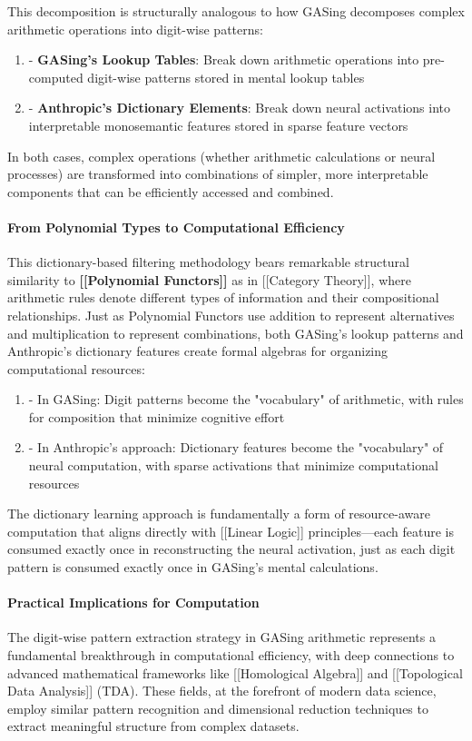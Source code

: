 \documentclass[11pt,a4paper]{article}
\begin{document}
This decomposition is structurally analogous to how GASing decomposes complex arithmetic operations into digit-wise patterns:

\begin{enumerate}
  \item - \textbf{GASing's Lookup Tables}: Break down arithmetic operations into pre-computed digit-wise patterns stored in mental lookup tables
  \item - \textbf{Anthropic's Dictionary Elements}: Break down neural activations into interpretable monosemantic features stored in sparse feature vectors
\end{enumerate}

In both cases, complex operations (whether arithmetic calculations or neural processes) are transformed into combinations of simpler, more interpretable components that can be efficiently accessed and combined.

\paragraph{From Polynomial Types to Computational Efficiency}
This dictionary-based filtering methodology bears remarkable structural similarity to \textbf{[[Polynomial Functors]]} as in [[Category Theory]], where arithmetic rules denote different types of information and their compositional relationships. Just as Polynomial Functors use addition to represent alternatives and multiplication to represent combinations, both GASing's lookup patterns and Anthropic's dictionary features create formal algebras for organizing computational resources:

\begin{enumerate}
  \item - In GASing: Digit patterns become the "vocabulary" of arithmetic, with rules for composition that minimize cognitive effort
  \item - In Anthropic's approach: Dictionary features become the "vocabulary" of neural computation, with sparse activations that minimize computational resources
\end{enumerate}

The dictionary learning approach is fundamentally a form of resource-aware computation that aligns directly with [[Linear Logic]] principles—each feature is consumed exactly once in reconstructing the neural activation, just as each digit pattern is consumed exactly once in GASing's mental calculations.

\paragraph{Practical Implications for Computation}
The digit-wise pattern extraction strategy in GASing arithmetic represents a fundamental breakthrough in computational efficiency, with deep connections to advanced mathematical frameworks like [[Homological Algebra]] and [[Topological Data Analysis]] (TDA). These fields, at the forefront of modern data science, employ similar pattern recognition and dimensional reduction techniques to extract meaningful structure from complex datasets.
\end{document}
